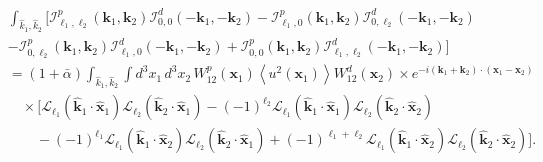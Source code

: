 \documentclass[a4paper,11pt]{article}
\begin{document}
\begin{align}
&\int_{\hat{k}_1,\hat{k}_2}
\Big[
\mathcal{I}^p_{\ell_1,\ell_2}(\mathbf{k}_1,\mathbf{k}_2)
\mathcal{I}^d_{0,0}(-\mathbf{k}_1,-\mathbf{k}_2)
-
\mathcal{I}^p_{\ell_1,0}(\mathbf{k}_1,\mathbf{k}_2)
\mathcal{I}^d_{0,\ell_2}(-\mathbf{k}_1,-\mathbf{k}_2)
\nonumber\\
&
-
\mathcal{I}^p_{0,\ell_2}(\mathbf{k}_1,\mathbf{k}_2)
\mathcal{I}^d_{\ell_1,0}(-\mathbf{k}_1,-\mathbf{k}_2)
+
\mathcal{I}^p_{0,0}(\mathbf{k}_1,\mathbf{k}_2)
\mathcal{I}^d_{\ell_1,\ell_2}(-\mathbf{k}_1,-\mathbf{k}_2)
\Big]\nonumber\\
&=
(1+\bar{\alpha})
\int_{\hat{k}_1,\hat{k}_2}
\int d^3x_1\,d^3x_2\,
W^p_{12}(\mathbf{x}_1)
\left\langle u^2(\mathbf{x}_1)\right\rangle
W^d_{12}(\mathbf{x}_2)
\times e^{-i(\mathbf{k}_1+\mathbf{k}_2)\cdot(\mathbf{x}_1-\mathbf{x}_2)}
\nonumber\\
&\quad\times
\Big[
\mathcal{L}_{\ell_1}(\hat{\mathbf{k}}_1\cdot\hat{\mathbf{x}}_1)
\mathcal{L}_{\ell_2}(\hat{\mathbf{k}}_2\cdot\hat{\mathbf{x}}_1)
-(-1)^{\ell_2}
\mathcal{L}_{\ell_1}(\hat{\mathbf{k}}_1\cdot\hat{\mathbf{x}}_1)
\mathcal{L}_{\ell_2}(\hat{\mathbf{k}}_2\cdot\hat{\mathbf{x}}_2)
\nonumber\\
&\qquad
-(-1)^{\ell_1}
\mathcal{L}_{\ell_1}(\hat{\mathbf{k}}_1\cdot\hat{\mathbf{x}}_2)
\mathcal{L}_{\ell_2}(\hat{\mathbf{k}}_2\cdot\hat{\mathbf{x}}_1)
+(-1)^{\ell_1+\ell_2}
\mathcal{L}_{\ell_1}(\hat{\mathbf{k}}_1\cdot\hat{\mathbf{x}}_2)
\mathcal{L}_{\ell_2}(\hat{\mathbf{k}}_2\cdot\hat{\mathbf{x}}_2)
\Big].
\end{align}
\end{document}
